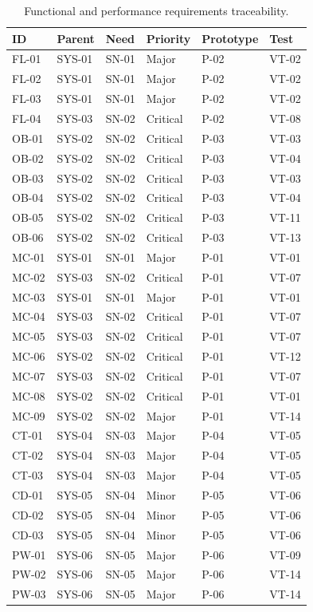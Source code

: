 \begin{table}[H]
\centering
\caption{Functional and performance requirements traceability.}
\label{tab:app-trace-functional}
\scriptsize
\begin{tabular}{l l l l l l}
\hline
\textbf{ID} & \textbf{Parent} & \textbf{Need} & \textbf{Priority} & \textbf{Prototype} & \textbf{Test} \\
\hline
FL-01 & SYS-01 & SN-01 & Major & P-02 & VT-02 \\
FL-02 & SYS-01 & SN-01 & Major & P-02 & VT-02 \\
FL-03 & SYS-01 & SN-01 & Major & P-02 & VT-02 \\
FL-04 & SYS-03 & SN-02 & Critical & P-02 & VT-08 \\
OB-01 & SYS-02 & SN-02 & Critical & P-03 & VT-03 \\
OB-02 & SYS-02 & SN-02 & Critical & P-03 & VT-04 \\
OB-03 & SYS-02 & SN-02 & Critical & P-03 & VT-03 \\
OB-04 & SYS-02 & SN-02 & Critical & P-03 & VT-04 \\
OB-05 & SYS-02 & SN-02 & Critical & P-03 & VT-11 \\
OB-06 & SYS-02 & SN-02 & Critical & P-03 & VT-13 \\
MC-01 & SYS-01 & SN-01 & Major & P-01 & VT-01 \\
MC-02 & SYS-03 & SN-02 & Critical & P-01 & VT-07 \\
MC-03 & SYS-01 & SN-01 & Major & P-01 & VT-01 \\
MC-04 & SYS-03 & SN-02 & Critical & P-01 & VT-07 \\
MC-05 & SYS-03 & SN-02 & Critical & P-01 & VT-07 \\
MC-06 & SYS-02 & SN-02 & Critical & P-01 & VT-12 \\
MC-07 & SYS-03 & SN-02 & Critical & P-01 & VT-07 \\
MC-08 & SYS-02 & SN-02 & Critical & P-01 & VT-01 \\
MC-09 & SYS-02 & SN-02 & Major & P-01 & VT-14 \\
CT-01 & SYS-04 & SN-03 & Major & P-04 & VT-05 \\
CT-02 & SYS-04 & SN-03 & Major & P-04 & VT-05 \\
CT-03 & SYS-04 & SN-03 & Major & P-04 & VT-05 \\
CD-01 & SYS-05 & SN-04 & Minor & P-05 & VT-06 \\
CD-02 & SYS-05 & SN-04 & Minor & P-05 & VT-06 \\
CD-03 & SYS-05 & SN-04 & Minor & P-05 & VT-06 \\
PW-01 & SYS-06 & SN-05 & Major & P-06 & VT-09 \\
PW-02 & SYS-06 & SN-05 & Major & P-06 & VT-14 \\
PW-03 & SYS-06 & SN-05 & Major & P-06 & VT-14 \\
\hline
\end{tabular}
\end{table}

